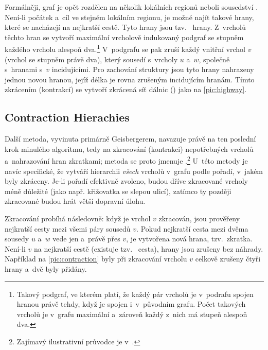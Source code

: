 Formálněji, graf je opět rozdělen na několik lokálních regionů neboli sousedství \cite{sandersEnginneringHH}. Není-li počátek a~cíl ve stejném lokálním regionu, je možné najít takové hrany, které se nacházejí na nejkratší cestě. Tyto hrany jsou tzv.~ hrany. Z~vrcholů těchto hran se vytvoří maximální vrcholově indukovaný podgraf se stupněm každého vrcholu alespoň dva.\footnote{Takový podgraf, ve kterém platí, že každý pár vrcholů je v~podrafu spojen hranou právě tehdy, když je spojen i~v~původním grafu. Počet takových vrcholů je v~grafu maximální a~zároveň každý z~nich má stupeň alespoň dva.} V~podgrafu se pak zruší každý vnitřní vrchol $v$ (vrchol se stupněm právě dva), který sousedí s~vrcholy $u$ a~$w$, společně s~hranami s~$v$ incidujícími. Pro zachování struktury jsou tyto hrany nahrazeny jednou novou hranou, jejíž délka je rovna zrušeným incidujícím hranám. Tímto zkrácením (kontrakcí) se vytvoří zkrácená síť dálnic () jako na \autoref{pic:highway}.



\subsection{Contraction Hierachies}
\label{staticCH}
Další metoda, vyvinuta primárně Geisbergerem, navazuje právě na ten poslední krok minulého algoritmu, tedy na zkracování (kontrakci) nepotřebných vrcholů a~nahrazování hran zkratkami; metoda se proto jmenuje  \cite{geisberger2008CHDiploma, geisberger2008CHFaster}.\footnote{Zajímavý ilustrativní průvodce je v~\cite{lazarsfeldGuide}.} U~této metody je navíc specifické, že vytváří hierarchii \emph{všech} vrcholů v~grafu podle pořadí, v~jakém byly zkráceny. Je-li pořadí efektivně zvoleno, budou dříve zkracované vrcholy méně důležité (jako např. křižovatka se slepou ulicí), zatímco ty později zkracované budou hrát větší dopravní úlohu. 

Zkracování probíhá následovně: když je vrchol $v$ zkracován, jsou prověřeny nejkratší cesty mezi všemi páry sousedů $v$. Pokud nejkratší cesta mezi dvěma sousedy $u$ a~$w$ vede jen a~právě přes $v$, je vytvořena nová hrana, tzv.~zkratka. Není-li $v$ na nejkratší cestě (existuje tzv.~ cesta), hrany jsou zrušeny bez náhrady. Například na \autoref{pic:contraction} byly při zkracování vrcholu $v$ celkově zrušeny čtyři hrany a~dvě byly přidány.

